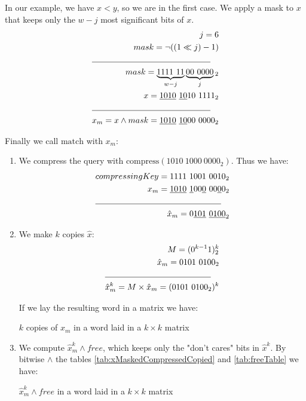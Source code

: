 \begin{enumerate}
    In our example, we have $x < y$, so we are in the first case. We apply a mask to $x$ that keeps only the $w-j$ most significant bits of $x$. 
    \begin{align*}
        j = 6\\
        mask = \neg((1 \ll j) - 1)\\
        \cline{1-2}
        mask = \underbrace{1111\ 11}_{w-j}\underbrace{00\ 0000}_j{}_2\\
        x = \underline{1010}\ \underline{10}10\ 1111_2\\
        \cline{1-2}
        x_m = x \wedge mask = \underline{1010}\ \underline{10}00\ 0000_2
    \end{align*}

    Finally we call $\text{match}$ with $x_m$:
    \begin{enumerate}
        \item
        We compress the query with $\text{compress}(1010\ 1000\ 0000_2)$. Thus we have:
        \begin{align*}
            compressingKey = 1111\ 1001\ 0010_2\\
            x_m = \underline{1010}\ \underline{1}00\underline{0}\ 00\underline{0}0_2\\
            \cline{1-2}
            \hat x_m = 0\underline{101}\ \underline{0100}_2
        \end{align*}
        \item
        We make $k$ copies $\hat x$:
        \begin{align*}
            M = (0^{k-1}1)^k_2\\
            \hat x_m = 0101\ 0100_2\\
            \cline{1-2}
            \hat x^k_m = M \times \hat x_m = (0101\ 0100_2)^k\\
        \end{align*}
        
        If we lay the resulting word in a matrix we have:
        \begin{table}[H]
        \centering
        
        \caption[Example of $k$ copies of $\hat x_m$ in a word laid in a $k \times k$ matrix]{$k$ copies of $\hat x_m$ in a word laid in a $k \times k$ matrix}
        \label{tab:xMaskedCompressedCopied}
        \end{table}
        
        \item
        
        We compute $\hat x^k_m \wedge free$, which keeps only the "don't cares" bits in $\hat x^k$. By bitwise $\wedge$ the tables \ref{tab:xMaskedCompressedCopied} and \ref{tab:freeTable} we have:
        \begin{table}[H]
        \centering
        
        \caption[Example of $\hat x^k_m \wedge free$ in a word laid in a $k \times k$ matrix]{$\hat x^k_m \wedge free$ in a word laid in a $k \times k$ matrix}
        \label{tab:freeANDxMaskedCompressedCopied}
        \end{table}
        

\end{enumerate}
\end{enumerate}
